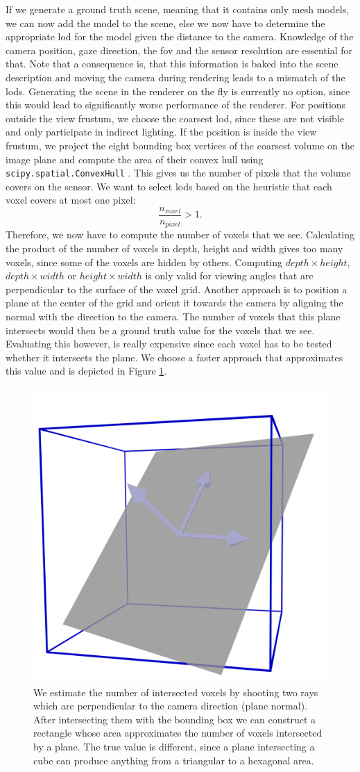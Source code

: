 If we generate a ground truth scene, meaning that it contains only mesh models, we can now add the model to the scene, else we now have to determine the appropriate \ac{lod} for the model given the distance to the camera.
Knowledge of the camera position, gaze direction, the \ac{fov} and the sensor resolution are essential for that.
Note that a consequence is, that this information is baked into the scene description and moving the camera during rendering leads to a mismatch of the \acp{lod}.
Generating the scene in the renderer on the fly is currently no option, since this would lead to significantly worse performance of the renderer.
For positions outside the view frustum, we choose the coarsest \ac{lod}, since these are not visible and only participate in indirect lighting.
If the position is inside the view frustum, we project the eight bounding box vertices of the coarsest volume on the image plane and compute the area of their convex hull using \texttt{scipy.spatial.ConvexHull} \cite{scipy}.
This gives us the number of pixels that the volume covers on the sensor.
We want to select \acp{lod} based on the heuristic that each voxel covers at most one pixel:
\begin{equation*}
    \frac{n_{voxel}}{n_{pixel}} > 1.
\end{equation*}
Therefore, we now have to compute the number of voxels that we see.
Calculating the product of the number of voxels in depth, height and width gives too many voxels, since some of the voxels are hidden by others.
Computing $depth \times height$, $depth \times width$ or $height \times width$ is only valid for viewing angles that are perpendicular to the surface of the voxel grid.
Another approach is to position a plane at the center of the grid and orient it towards the camera by aligning the normal with the direction to the camera.
The number of voxels that this plane intersects would then be a ground truth value for the voxels that we see.
Evaluating this however, is really expensive since each voxel has to be tested whether it intersects the plane.
We choose a faster approach that approximates this value and is depicted in Figure \ref{fig:voxel_estimation}.
\begin{figure}[ht]
    \centering
    \includegraphics[width=0.3\linewidth]{img/voxel_estimation.png}
    \caption[Estimation of intersected voxels]{We estimate the number of intersected voxels by shooting two rays which are perpendicular to the camera direction (plane normal). After intersecting them with the bounding box we can construct a rectangle whose area approximates the number of voxels intersected by a plane. The true value is different, since a plane intersecting a cube can produce anything from a triangular to a hexagonal area.}
    \label{fig:voxel_estimation}
\end{figure}

